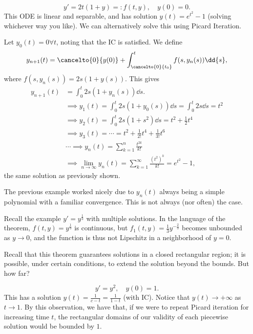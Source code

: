 \begin{example}
    $$y' = 2t(1+y) =: f(t, y), \quad y(0) = 0.$$
    This ODE is linear and separable, and has solution $y(t) = e^{t^2} - 1$ (solving whichever way you like). We can alternatively solve this using Picard Iteration.

    Let $y_0(t) = 0 \forall t$, noting that the IC is satisfied. We define \[
    y_{n+1}(t) = \cancelto{0}{y(0)} + \int_{\cancelto{0}{t_0}}^t f(s, y_n(s)) \dd{s},
    \]
    where $f(s, y_n(s)) = 2s(1+y(s))$. This gives\begin{align*}
        y_{n+1}(t) &= \int_0^t 2s (1+y_n(s))\dd{s}.\\
        &\implies y_{1}(t) = \int_0^t 2s(1+y_0(s))\dd{s} = \int_0^t 2s \dd{s} = t^2\\
        &\implies y_2(t) = \int_0^t 2s(1+s^2)\dd{s} = t^2 + \frac{1}{2}t^4\\
        &\implies y_3(t) = \cdots = t^2 + \frac{1}{2!}t^4 + \frac{1}{3!}t^6\\
        &\cdots \implies y_n(t) = \sum_{k=1}^n \frac{t^{2k}}{k!}\\
        &\implies \lim_{n\to\infty} y_{n}(t)  = \sum_{k=1}^\infty \frac{(t^{2})^k}{k!} = e^{t^2}-1,
    \end{align*}
    the same solution as previously shown.
\end{example}

\begin{remark}
    The previous example worked nicely due to $y_n(t)$ always being a simple polynomial with a familiar convergence. This is not always (nor often) the case.
\end{remark}

\begin{remark}
    Recall the example $y' = y^{\frac{1}{3}}$ with multiple solutions. In the language of the theorem, $f(t, y) = y^{\frac{1}{3}}$ is continuous, but $f_1(t, y) = \frac{1}{3}y^{-\frac{2}{3}}$ becomes unbounded as $y \to 0$, and the function is thus not Lipschitz in a neighborhood of $y=0$.
\end{remark}

\begin{remark}
    Recall that this theorem guarantees solutions in a closed rectangular region; it is possible, under certain conditions, to extend the solution beyond the bounds. But how far?
\end{remark}
\begin{example}\label{ex:corrunique}
    $$y' = y^2, \quad y(0) = 1.$$
    This has a solution $y(t) = \frac{1}{c-t} = \frac{1}{1-t}$ (with IC). Notice that $y(t) \to +\infty$ as $t \to 1$. By this observation, we have that, if we were to repeat Picard iteration for increasing time $t$, the rectangular domains of our validity of each piecewise solution would be bounded by $1$.
\end{example}


